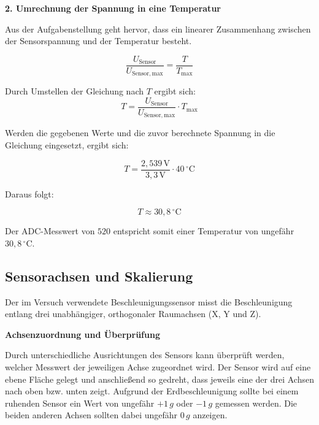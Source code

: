 \documentclass[a4paper,oneside,10pt]{article}%
\begin{document}
\textbf{2. Umrechnung der Spannung in eine Temperatur}

Aus der Aufgabenstellung geht hervor, dass ein linearer Zusammenhang
zwischen der Sensorspannung und der Temperatur besteht.

\begin{equation}
    \frac{U_{\mathrm{Sensor}}}{U_{\mathrm{Sensor,max}}}
    =
    \frac{T}{T_{\mathrm{max}}}
\end{equation}

Durch Umstellen der Gleichung nach $T$ ergibt sich:
\begin{equation}
    T =
    \frac{U_{\mathrm{Sensor}}}{U_{\mathrm{Sensor,max}}}
    \cdot T_{\mathrm{max}}
\end{equation}

Werden die gegebenen Werte und die zuvor berechnete Spannung 
in die Gleichung eingesetzt, ergibt sich:

\begin{equation}
    T =
    \frac{2{,}539\,\mathrm{V}}{3{,}3\,\mathrm{V}}
    \cdot 40\,^\circ\mathrm{C}
\end{equation}

Daraus folgt:

\begin{equation}
    \boxed{T \approx 30{,}8\,^\circ\mathrm{C}}
\end{equation}

Der ADC-Messwert von $520$ entspricht somit einer Temperatur
von ungefähr $30{,}8\,^\circ\mathrm{C}$.

\subsection{Sensorachsen und Skalierung}

Der im Versuch verwendete Beschleunigungssensor misst die Beschleunigung entlang drei unabhängiger, orthogonaler
Raumachsen (X, Y und Z). 

\textbf{Achsenzuordnung und Überprüfung}

Durch unterschiedliche Ausrichtungen des Sensors kann überprüft werden, welcher Messwert der jeweiligen Achse zugeordnet wird.
Der Sensor wird auf eine ebene Fläche gelegt und anschließend so gedreht, dass jeweils eine der drei Achsen nach oben bzw. unten zeigt.
Aufgrund der Erdbeschleunigung sollte bei einem ruhenden Sensor ein Wert von ungefähr $+1\,g$ oder $-1\,g$ gemessen werden. 
Die beiden anderen Achsen sollten dabei ungefähr $0\,g$ anzeigen. \cite[S. 10, Abschnitt 3.2]{nxp_mma8452q}
\end{document}

